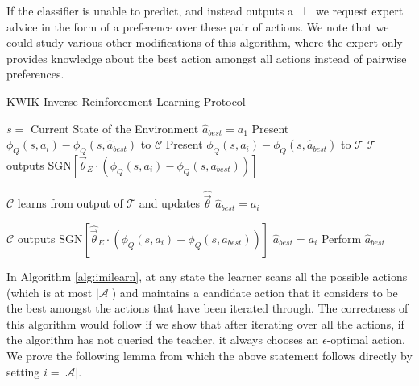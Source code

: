 If the classifier is unable to predict, and instead outputs a $\perp$ we request expert advice in the form of a preference over these pair of actions. We note that we could study various other modifications of this algorithm, where the expert only provides knowledge about the best action amongst all actions instead of pairwise preferences. 




\begin{algorithm}[H]
\caption{KWIK Inverse Reinforcement Learning Protocol}
\label{alg:imilearn}
\begin{algorithmic}
        \State $s = $ Current State of the Environment
        \State $\hat{a}_{best} = a_1$
            \State Present $\phi_Q(s,a_i) - \phi_Q(s,\hat{a}_{best})$ to $\mathcal{C}$
                \State Present  $\phi_Q(s,a_i) - \phi_Q(s,\hat{a}_{best})$ to  $\mathcal{T}$
               \State $\mathcal{T}$ outputs  $\text{SGN}[{\vec{\theta}}_E \cdot(\phi_Q(s,a_i) - \phi_Q(s,a_{best}))]$

                \State $\mathcal{C}$ learns from output of $\mathcal{T}$ and updates $\hat{\vec{\theta}}$
                    \State $\hat{a}_{best} = a_i$
                \EndIf
            
            \Else
                \State $\mathcal{C}$ outputs $\text{SGN}[\hat{\vec{\theta}}_E \cdot(\phi_Q(s,a_i) - \phi_Q(s,a_{best}))]$
                    \State $\hat{a}_{best} = a_i$
                \EndIf
            \EndIf
        \EndFor
        \State Perform $\hat{a}_{best}$
    \EndFor
\end{algorithmic}
\end{algorithm}



In Algorithm \ref{alg:imilearn}, at any state the learner scans all the possible actions (which is at most $|\mathcal{A}|$) and maintains a candidate action that it considers to be the best amongst the actions that have been iterated through. The correctness of this algorithm would follow if we show that after iterating over all the actions, if the algorithm has not queried the teacher, it always chooses an $\epsilon$-optimal action. We prove the following lemma from which the above statement follows directly by setting $i=|\mathcal{A}|$. 

